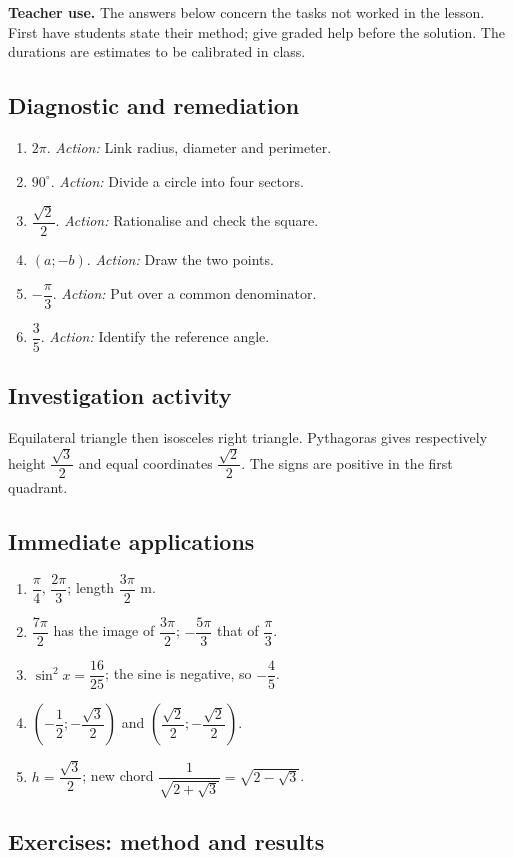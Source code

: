 \label{C10-CORR}
\textbf{Teacher use.} The answers below concern the tasks not worked in the lesson. First have students state their method; give graded help before the solution. The durations are estimates to be calibrated in class.
\subsection*{Diagnostic and remediation}
\begin{enumerate}
\item $2\pi$. \textit{Action:} Link radius, diameter and perimeter.
\item $90^\circ$. \textit{Action:} Divide a circle into four sectors.
\item $\dfrac{\sqrt 2}{2}$. \textit{Action:} Rationalise and check the square.
\item $(a;-b)$. \textit{Action:} Draw the two points.
\item $-\dfrac{\pi}{3}$. \textit{Action:} Put over a common denominator.
\item $\dfrac{3}{5}$. \textit{Action:} Identify the reference angle.
\end{enumerate}
\subsection*{Investigation activity}
Equilateral triangle then isosceles right triangle. Pythagoras gives respectively height $\dfrac{\sqrt 3}{2}$ and equal coordinates $\dfrac{\sqrt 2}{2}$. The signs are positive in the first quadrant.
\subsection*{Immediate applications}
\begin{enumerate}
\item $\dfrac{\pi}{4}$, $\dfrac{2\pi}{3}$; length $\dfrac{3\pi}{2}$ m.
\item $\dfrac{7\pi}{2}$ has the image of $\dfrac{3\pi}{2}$; $-\dfrac{5\pi}{3}$ that of $\dfrac{\pi}{3}$.
\item $\sin ^2x=\dfrac{16}{25}$; the sine is negative, so $-\dfrac{4}{5}$.
\item $(-\dfrac{1}{2};-\dfrac{\sqrt 3}{2})$ and $(\dfrac{\sqrt 2}{2};-\dfrac{\sqrt 2}{2})$.
\item $h=\dfrac{\sqrt 3}{2}$; new chord $\dfrac{1}{\sqrt {2+\sqrt3}}=\sqrt {2-\sqrt3}$.
\end{enumerate}
\subsection*{Exercises: method and results}
